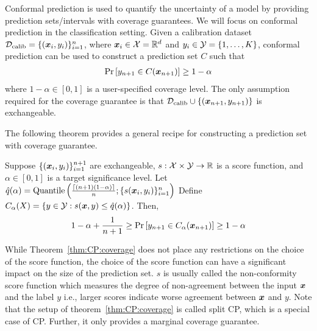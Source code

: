 Conformal prediction is used to quantify the uncertainty of a model by providing prediction sets/intervals with coverage guarantees.
We will focus on conformal prediction in the classification setting.
Given a calibration dataset ${\mathcal{D}}_{\text{calib}} = \{({\bm{x}}_i, y_i)\}_{i=1}^n$, where ${\bm{x}}_i \in {\mathcal{X}} = \mathbb{R}^d$ and $y_i \in {\mathcal{Y}} = \{1, \dots, K\}$, conformal prediction can be used to construct a prediction set $C$ such that
\begin{align*}
    \Pr\left[y_{n+1} \in C({\bm{x}}_{n+1}) \right] \geq 1 - \alpha
\end{align*}
where $1 - \alpha \in [0, 1]$ is a user-specified coverage level.
The only assumption required for the coverage guarantee is that ${\mathcal{D}}_{\text{calib}} \cup \{({\bm{x}}_{n+1}, y_{n+1})\}$ is exchangeable.

The following theorem provides a general recipe for constructing a prediction set with coverage guarantee.
\begin{theorem}
    Suppose $\{({\bm{x}}_i, y_i)\}_{i=1}^{n+1}$ are exchangeable, $s: {\mathcal{X}} \times {\mathcal{Y}} \rightarrow \mathbb{R}$ is a score function, and $\alpha \in [0, 1]$ is a target significance level.
    Let $\hat{q}(\alpha) = \text{Quantile}\left(\frac{\lceil(n+1)(1-\alpha)\rceil}{n}; \{s({\bm{x}}_i, y_i)\}_{i=1}^{n}\right)$
    Define $C_{\alpha}(X) = \{y \in {\mathcal{Y}}: s({\bm{x}}, y) \leq \hat{q}(\alpha)\}$.
    Then,
    \begin{align}
        1 - \alpha +\frac{1}{n+1} \geq \Pr\left[y_{n+1} \in C_{\alpha}({\bm{x}}_{n+1}) \right] \geq 1 - \alpha
        \label{eq:CP:coverage}
    \end{align}
    \label{thm:CP:coverage}
\end{theorem}

While Theorem~\ref{thm:CP:coverage} does not place any restrictions on the choice of the score function, the choice of the score function can have a significant impact on the size of the prediction set.
$s$ is usually called the non-conformity score function which measures the degree of non-agreement between the input ${\bm{x}}$ and the label $y$ i.e., larger scores indicate worse agreement between ${\bm{x}}$ and $y$.
Note that the setup of theorem~\ref{thm:CP:coverage} is called split CP, which is a special case of CP.
Further, it only provides a marginal coverage guarantee.
